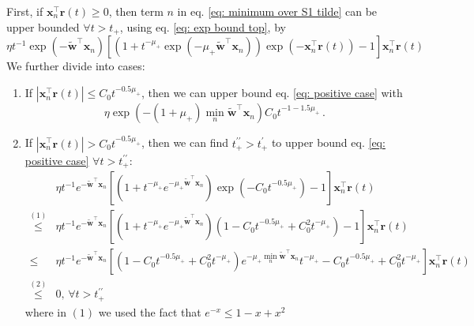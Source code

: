 \documentclass[twoside,11pt,english]{article}
\begin{document}
First, if $\mathbf{x}_{n}^{\top}\mathbf{r}\left(t\right)\geq0$, then
term $n$ in eq. \ref{eq: minimum over S1 tilde} can be upper bounded
$\forall t>t_{+}$, using eq. \ref{eq: exp bound top}, by 
\begin{equation}
\eta t^{-1}\exp\left(-\tilde{\mathbf{w}}^{\top}\mathbf{x}_{n}\right)\left[\left(1+t^{-\mu_{+}}\exp\left(-\mu_{+}\tilde{\mathbf{w}}^{\top}\mathbf{x}_{n}\right)\right)\exp\left(-\mathbf{x}_{n}^{\top}\mathbf{r}\left(t\right)\right)-1\right]\mathbf{x}_{n}^{\top}\mathbf{r}\left(t\right)\label{eq: positive case}
\end{equation}
We further divide into cases: 
\begin{enumerate}
\item If $\left|\mathbf{x}_{n}^{\top}\mathbf{r}(t)\right|\leq C_{0}t^{-0.5\mu_{+}}$,
then we can upper bound eq. \ref{eq: positive case} with 
\begin{equation}
\eta\exp\left(-\left(1+\mu_{+}\right)\min_{n}\tilde{\mathbf{w}}^{\top}\mathbf{x}_{n}\right)C_{0}t^{-1-1.5\mu_{+}}\,.\label{eq: positive case a}
\end{equation}
\item If $\left|\mathbf{x}_{n}^{\top}\mathbf{r}(t)\right|>C_{0}t^{-0.5\mu_{+}}$,
then we can find $t_{+}^{\prime\prime}>t_{+}^{\prime}$ to upper bound
eq. \ref{eq: positive case} $\forall t>t_{+}^{\prime\prime}$: 
\begin{align}
 & \eta t^{-1}e^{-\tilde{\mathbf{w}}^{\top}\mathbf{x}_{n}}\left[\left(1+t^{-\mu_{+}}e^{-\mu_{+}\tilde{\mathbf{w}}^{\top}\mathbf{x}_{n}}\right)\exp\left(-C_{0}t^{-0.5\mu_{+}}\right)-1\right]\mathbf{x}_{n}^{\top}\mathbf{r}\left(t\right)\,\nonumber \\
\overset{\left(1\right)}{\leq} & \eta t^{-1}e^{-\tilde{\mathbf{w}}^{\top}\mathbf{x}_{n}}\left[\left(1+t^{-\mu_{+}}e^{-\mu_{+}\tilde{\mathbf{w}}^{\top}\mathbf{x}_{n}}\right)\left(1-C_{0}t^{-0.5\mu_{+}}+C_{0}^{2}t^{-\mu_{+}}\right)-1\right]\mathbf{x}_{n}^{\top}\mathbf{r}\left(t\right)\nonumber \\
\leq & \eta t^{-1}e^{-\tilde{\mathbf{w}}^{\top}\mathbf{x}_{n}}\left[\left(1-C_{0}t^{-0.5\mu_{+}}+C_{0}^{2}t^{-\mu_{+}}\right)e^{-\mu_{+}\min\limits_{n}\tilde{\mathbf{w}}^{\top}\mathbf{x}_{n}}t^{-\mu_{+}}-C_{0}t^{-0.5\mu_{+}}+C_{0}^{2}t^{-\mu_{+}}\right]\mathbf{x}_{n}^{\top}\mathbf{r}\left(t\right)\nonumber \\
\overset{\left(2\right)}{\leq} & 0,\,\forall t>t_{+}^{\prime\prime}\label{eq: positive case b}
\end{align}
where in $\left(1\right)$ we used the fact that $e^{-x}\leq1-x+x^{2}$

\end{enumerate}
\end{document}

